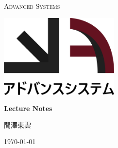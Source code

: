 \documentclass[a4paper]{article}
\begin{document}
\begin{titlepage}
    \centering
    {\scshape\Huge Advanced Systems \par}
    \par\vspace{1cm}
    \includegraphics[width=0.45\textwidth]{images/logo.png}\par
    \vspace{3cm}
    {\huge\bfseries Lecture Notes \par}
    \vspace{1cm}
    \begin{CJK}{UTF8}{song}
        {\LARGE 間澤東雲 \par}
    \end{CJK}
    \vspace{1cm}
    {\large\today\par}
    \vfill
    \begin{abstract}
        This document is a compilation of lecture notes for intermediate mathematics.
        It is intended to serve as a study guide for members of the Advanced System
        organization.
    \end{abstract}
\end{titlepage}

\newpage

\printnoidxglossary[type=\acronymtype]

\newpage

\tableofcontents

\newpage











\newpage

\medskip
\printbibliography
\end{document}
